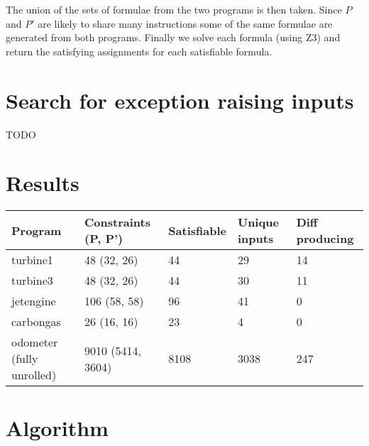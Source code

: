 \documentclass{article}
\begin{document}
The union of the sets of formulae from the two programs is then taken. Since $P$
and $P'$ are likely to share many instructions some of the same formulae are
generated from both programs. Finally we solve each formula (using Z3) and
return the satisfying assignments for each satisfiable formula.

\section{Search for exception raising inputs}

TODO

\section{Results}

\begin{table}[h]
\begin{tabular}{l|llll}
Program                   & Constraints (P, P') & Satisfiable & Unique inputs & Diff producing \\ \hline
turbine1                  & 48 (32, 26)         & 44          & 29            & 14             \\
turbine3                  & 48 (32, 26)         & 44          & 30            & 11             \\
jetengine                 & 106 (58, 58)        & 96          & 41            & 0              \\
carbongas                 & 26 (16, 16)         & 23          & 4             & 0              \\
odometer (fully unrolled) & 9010 (5414, 3604)   & 8108        & 3038          & 247
\end{tabular}
\end{table}

\section{Algorithm}
\end{document}
